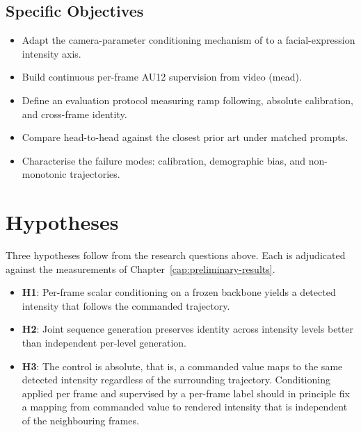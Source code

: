 \subsection{Specific Objectives}\label{subsec:specific-objectives}

\begin{itemize}
    \item Adapt the camera-parameter conditioning mechanism of \citet{yuan2024genphoto} to a facial-expression intensity axis.
    \item Build continuous per-frame AU12 supervision from video (\gls{mead}).
    \item Define an evaluation protocol measuring ramp following, absolute calibration, and cross-frame identity.
    \item Compare head-to-head against the closest prior art under matched prompts.
    \item Characterise the failure modes: calibration, demographic bias, and non-monotonic trajectories.
\end{itemize}

\section{Hypotheses}\label{sec:hypotheses}


Three hypotheses follow from the research questions above. Each is adjudicated against the
measurements of Chapter~\ref{cap:preliminary-results}.

\begin{itemize}
    \item \textbf{H1}: Per-frame scalar conditioning on a frozen backbone yields a detected
    intensity that follows the commanded trajectory.
    \item \textbf{H2}: Joint sequence generation preserves identity across intensity levels
    better than independent per-level generation.
    \item \textbf{H3}: The control is absolute, that is, a commanded value maps to the same
    detected intensity regardless of the surrounding trajectory. Conditioning applied per frame
    and supervised by a per-frame label should in principle fix a mapping from commanded value to
    rendered intensity that is independent of the neighbouring frames.
\end{itemize}

